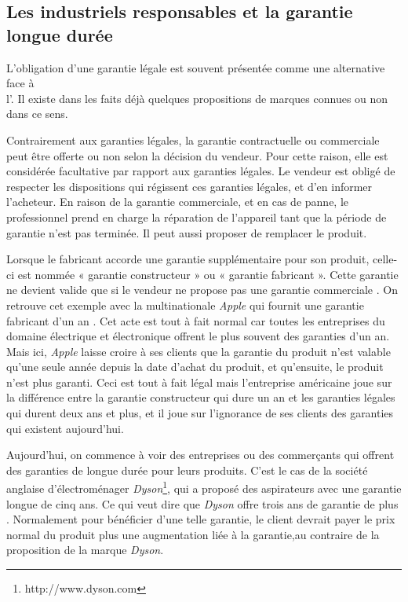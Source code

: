 \subsection{Les industriels responsables et la garantie longue durée}


L'obligation d'une garantie légale est souvent présentée comme une alternative face à \\l'\op. Il existe dans les faits déjà quelques propositions de marques connues ou non dans ce sens.

\bigbreak
Contrairement aux garanties légales, la garantie contractuelle ou commerciale peut être offerte ou non selon la décision du vendeur. Pour cette raison, elle est considérée facultative par rapport aux garanties légales. Le vendeur est obligé de respecter les dispositions qui régissent ces garanties légales, et d'en informer l'acheteur. 
En raison de la garantie commerciale, et en cas de panne, le professionnel prend en charge la réparation de l'appareil tant que la période de garantie n'est pas terminée. Il peut aussi proposer de remplacer le produit.

\bigbreak
Lorsque le fabricant accorde une garantie supplémentaire pour son produit, celle-ci est nommée « garantie constructeur » ou « garantie fabricant ». Cette garantie ne devient valide que si le vendeur ne propose pas une garantie commerciale \cite{loigarantie}.
On retrouve cet exemple avec la multinationale \textit{Apple} qui fournit une garantie fabricant d'un an \cite{apple}. Cet acte est tout à fait normal car toutes les entreprises du domaine électrique et électronique offrent le plus souvent des garanties d'un an. Mais ici, \textit{Apple} laisse croire à ses clients que la garantie du produit n'est valable qu'une seule année depuis la date d'achat du produit, et qu'ensuite, le produit n'est plus garanti. Ceci est tout à fait légal mais l'entreprise américaine joue sur la différence entre la garantie constructeur qui dure un an et les garanties légales qui durent deux ans et plus, et il joue sur l'ignorance de ses clients des garanties qui existent aujourd'hui.

\bigbreak
Aujourd'hui, on commence à voir des entreprises ou des commerçants qui offrent des garanties de longue durée pour leurs produits. C'est le cas de la société anglaise d'électroménager \textit{Dyson}\footnote{http://www.dyson.com}, qui a proposé des aspirateurs avec une garantie longue de cinq ans. Ce qui veut dire que \textit{Dyson} offre trois ans de garantie de plus \cite{dyson}. Normalement pour bénéficier d'une telle garantie, le client devrait payer le prix normal du produit plus une augmentation liée à la garantie,au contraire de la proposition de la marque \textit{Dyson}.

